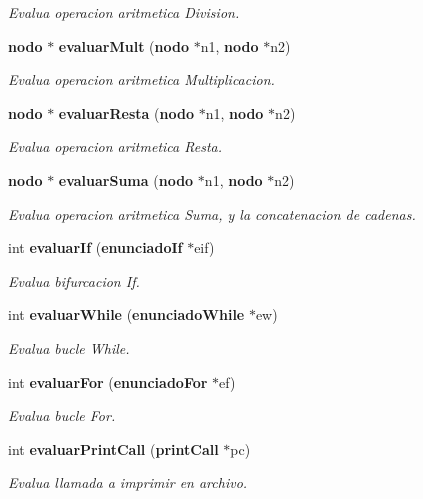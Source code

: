 \begin{CompactItemize}
\begin{CompactList}\small\item\em Evalua operacion aritmetica Division. \item\end{CompactList}\item 
{\bf nodo} $\ast$ {\bf evaluar\-Mult} ({\bf nodo} $\ast$n1, {\bf nodo} $\ast$n2)
\begin{CompactList}\small\item\em Evalua operacion aritmetica Multiplicacion. \item\end{CompactList}\item 
{\bf nodo} $\ast$ {\bf evaluar\-Resta} ({\bf nodo} $\ast$n1, {\bf nodo} $\ast$n2)
\begin{CompactList}\small\item\em Evalua operacion aritmetica Resta. \item\end{CompactList}\item 
{\bf nodo} $\ast$ {\bf evaluar\-Suma} ({\bf nodo} $\ast$n1, {\bf nodo} $\ast$n2)
\begin{CompactList}\small\item\em Evalua operacion aritmetica Suma, y la concatenacion de cadenas. \item\end{CompactList}\item 
int {\bf evaluar\-If} ({\bf enunciado\-If} $\ast$eif)
\begin{CompactList}\small\item\em Evalua bifurcacion If. \item\end{CompactList}\item 
int {\bf evaluar\-While} ({\bf enunciado\-While} $\ast$ew)
\begin{CompactList}\small\item\em Evalua bucle While. \item\end{CompactList}\item 
int {\bf evaluar\-For} ({\bf enunciado\-For} $\ast$ef)
\begin{CompactList}\small\item\em Evalua bucle For. \item\end{CompactList}\item 
int {\bf evaluar\-Print\-Call} ({\bf print\-Call} $\ast$pc)
\begin{CompactList}\small\item\em Evalua llamada a imprimir en archivo. \item\end{CompactList}\item 

\end{CompactItemize}
